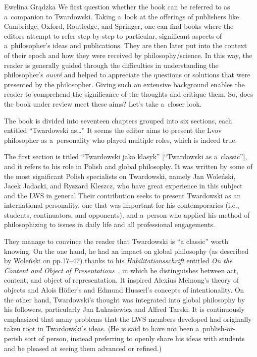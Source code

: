 \begin{newrevengenv}{Ewelina Grądzka}
We first question whether the book can be referred to as a~companion to Twardowski. Taking a~look at the offerings of publishers like Cambridge, Oxford, Routledge, and Springer, one can find books where the editors attempt to refer step by step to particular, significant aspects of a~philosopher's ideas and publications. They are then later put into the context of their epoch and how they were received by philosophy/science. In this way, the reader is generally guided through the difficulties in understanding the philosopher's \textit{ouvré} and helped to appreciate the questions or solutions that were presented by the philosopher. Giving such an extensive background enables the reader to comprehend the significance of the thoughts and critique them. So, does the book under review meet these aims? Let's take a~closer look.

The book is divided into seventeen chapters grouped into six sections, each entitled ``Twardowski as…'' It seems the editor aims to present the Lvov philosopher as a~personality who played multiple roles, which is indeed true.

The first section is titled ``Twardowski jako klasyk'' [``Twardowski as a~classic''], and it refers to his role in Polish and global philosophy. It was written by some of the most significant Polish specialists on Twardowski, namely Jan Woleński, Jacek Jadacki, and Ryszard Kleszcz, who have great experience in this subject and the LWS in general
\parencites[cf.][]{wolenski_filozoficzna_1985}{jadacki_semiotyka_1989}{jadacki_viewpoint_2003}{jadacki_polish_2009}{jadacki_polish_2015}{brandl_actions_1999}{jadacki_lvov-warsaw_2006}{kleszcz_metoda_2013}{chybinska_tradition_2016}{brozek_significance_2017}
Their contribution seeks to present Twardowski as an international personality, one that was important for his contemporaries (i.e., students, continuators, and opponents), and a~person who applied his method of philosophizing to issues in daily life and all professional engagements.

They manage to convince the reader that Twardowski is ``a classic'' worth knowing. On the one hand, he had an impact on global philosophy (as described by Woleński on pp.17–47) thanks to his \textit{Habilitationsschrift} entitled \textit{On the Content and Object of Presentations}~\parencite*{twardowski_1894},
in which he distinguishes between act, content, and object of representation. It inspired Alexius Meinong's theory of objects and Alois Höfler's and Edmund Husserl's concepts of intentionality. On the other hand, Twardowski's thought was integrated into global philosophy by his followers, particularly Jan Łukasiewicz and Alfred Tarski. It is continuously emphasized that many problems that the LWS members developed had originally taken root in Twardowski's ideas. (He is said to have not been a~publish-or-perish sort of person, instead preferring to openly share his ideas with students and be pleased at seeing them advanced or refined.)


\end{newrevengenv}

